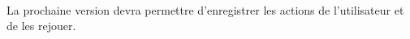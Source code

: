 \documentclass[a4paper,11pt]{article}
\begin{document}
\paragraph{}
La prochaine version devra permettre d'enregistrer les actions de l'utilisateur et de les rejouer. 




\newpage
\listoffigures  %
\listoftables
\newpage
\nocite{*}
\newpage
\end{document}
